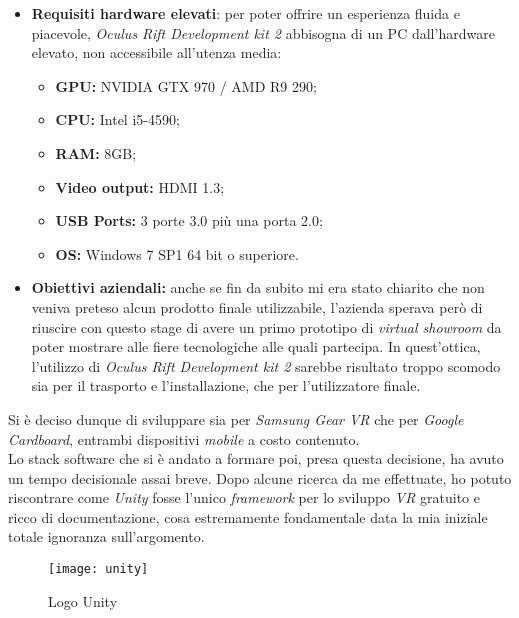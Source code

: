\begin{itemize}
	\item \textbf{Requisiti hardware elevati}: per poter offrire un esperienza fluida e piacevole, \textit{Oculus Rift Development kit 2} abbisogna di un PC dall'hardware elevato, non accessibile all'utenza media:
	\begin{itemize}
		\item \textbf{GPU:} NVIDIA GTX 970 / AMD R9 290;
		\item \textbf{CPU:} Intel i5-4590;
		\item \textbf{RAM:} 8GB;
		\item \textbf{Video output:} HDMI 1.3;
		\item \textbf{USB Ports:} 3 porte 3.0 più una porta 2.0;
		\item \textbf{OS:} Windows 7 SP1 64 bit o superiore.
	\end{itemize}
	
	\item \textbf{Obiettivi aziendali:} anche se fin da subito mi era stato chiarito che non veniva preteso alcun prodotto finale utilizzabile, l'azienda sperava però di riuscire con questo stage di avere un primo prototipo di \textit{virtual showroom} da poter mostrare alle fiere tecnologiche alle quali partecipa. In quest'ottica, l'utilizzo di \textit{Oculus Rift Development kit 2} sarebbe risultato troppo scomodo sia per il trasporto e l'installazione, che per l'utilizzatore finale.
\end{itemize}

Si è deciso dunque di sviluppare sia per \textit{Samsung Gear VR} che per \textit{Google Cardboard}, entrambi dispositivi \textit{mobile} a costo contenuto. \\
Lo stack software che si è andato a formare poi, presa questa decisione, ha avuto un tempo decisionale assai breve. Dopo alcune ricerca da me effettuate, ho potuto riscontrare come \textit{Unity} fosse l'unico \textit{framework} per lo sviluppo \textit{VR} gratuito e ricco di documentazione, cosa estremamente fondamentale data la mia iniziale totale ignoranza sull'argomento.

\label{Unity}
\begin{figure}[ht]
	\begin{center}
		\texttt{[image: unity]}
		\caption{Logo Unity}
	\end{center}
\end{figure}
\FloatBarrier

